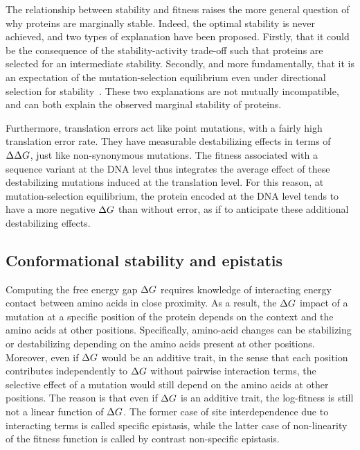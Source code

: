 The relationship between stability and fitness raises the more general question of why proteins are marginally stable.
Indeed, the optimal stability is never achieved, and two types of explanation have been proposed.
Firstly, that it could be the consequence of the stability-activity trade-off such that proteins are selected for an intermediate stability.
Secondly, and more fundamentally, that it is an expectation of the mutation-selection equilibrium even under directional selection for stability~\citep{Taverna2002}.
These two explanations are not mutually incompatible, and can both explain the observed marginal stability of proteins.

Furthermore, translation errors act like point mutations, with a fairly high translation error rate.
They have measurable destabilizing effects in terms of $\Delta \Delta G$, just like \gls{non-synonymous} mutations.
The fitness associated with a sequence variant at the \acrshort{DNA} level thus integrates the average effect of these destabilizing mutations induced at the translation level.
For this reason, at mutation-selection equilibrium, the protein encoded at the \acrshort{DNA} level tends to have a more negative $\Delta G$ than without error, as if to anticipate these additional destabilizing effects.

\subsection{Conformational stability and epistatis}
\label{subsec:conformational-stability-and-epistatis}

Computing the free energy gap $\Delta G$ requires knowledge of interacting energy contact between amino acids in close proximity.
As a result, the $\Delta G$ impact of a mutation at a specific position of the protein depends on the context and the amino acids at other positions.
Specifically, amino-acid changes can be stabilizing or destabilizing depending on the amino acids present at other positions.
Moreover, even if $\Delta G$ would be an additive trait, in the sense that each position contributes independently to $\Delta G$ without pairwise interaction terms, the selective effect of a mutation would still depend on the amino acids at other positions.
The reason is that even if $\Delta G$ is an additive trait, the log-fitness is still not a linear function of $\Delta G$.
The former case of site interdependence due to interacting terms is called specific epistasis, while the latter case of non-linearity of the fitness function is called by contrast non-specific epistasis.


